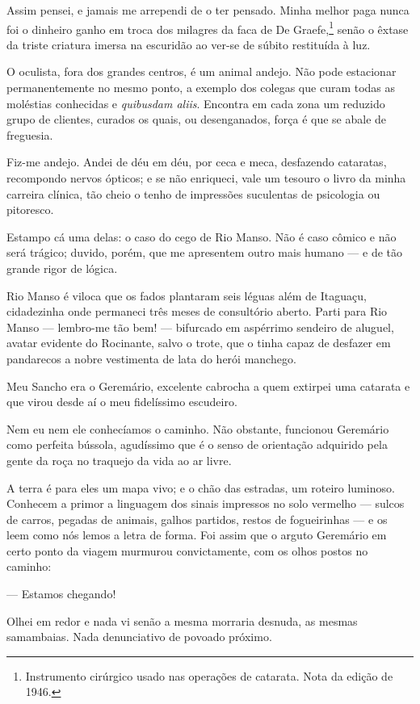 Assim pensei, e jamais me arrependi de o ter pensado. Minha melhor paga
nunca foi o dinheiro ganho em troca dos milagres da faca de De
Graefe,\footnote{Instrumento cirúrgico usado nas operações de catarata.
  Nota da edição de 1946.} senão o êxtase da triste criatura imersa na
escuridão ao ver-se de súbito restituída à luz.

O oculista, fora dos grandes centros, é um animal andejo. Não pode
estacionar permanentemente no mesmo ponto, a exemplo dos colegas que
curam todas as moléstias conhecidas e \emph{quibusdam aliis}. Encontra
em cada zona um reduzido grupo de clientes, curados os quais, ou
desenganados, força é que se abale de freguesia.

Fiz-me andejo. Andei de déu em déu, por ceca e meca, desfazendo
cataratas, recompondo nervos ópticos; e se não enriqueci, vale um
tesouro o livro da minha carreira clínica, tão cheio o tenho de
impressões suculentas de psicologia ou pitoresco.

Estampo cá uma delas: o caso do cego de Rio Manso. Não é caso cômico e
não será trágico; duvido, porém, que me apresentem outro mais humano ---
e de tão grande rigor de lógica.

Rio Manso é viloca que os fados plantaram seis léguas além de Itaguaçu,
cidadezinha onde permaneci três meses de consultório aberto. Parti para
Rio Manso --- lembro-me tão bem! --- bifurcado em aspérrimo sendeiro de
aluguel, avatar evidente do Rocinante, salvo o trote, que o tinha capaz
de desfazer em pandarecos a nobre vestimenta de lata do herói manchego.

Meu Sancho era o Geremário, excelente cabrocha a quem extirpei uma
catarata e que virou desde aí o meu fidelíssimo escudeiro.

Nem eu nem ele conhecíamos o caminho. Não obstante, funcionou Geremário
como perfeita bússola, agudíssimo que é o senso de orientação adquirido
pela gente da roça no traquejo da vida ao ar livre.

A terra é para eles um mapa vivo; e o chão das estradas, um roteiro
luminoso. Conhecem a primor a linguagem dos sinais impressos no solo
vermelho --- sulcos de carros, pegadas de animais, galhos partidos,
restos de fogueirinhas --- e os leem como nós lemos a letra de forma.
Foi assim que o arguto Geremário em certo ponto da viagem murmurou
convictamente, com os olhos postos no caminho:

--- Estamos chegando!

Olhei em redor e nada vi senão a mesma morraria desnuda, as mesmas
samambaias. Nada denunciativo de povoado próximo.

